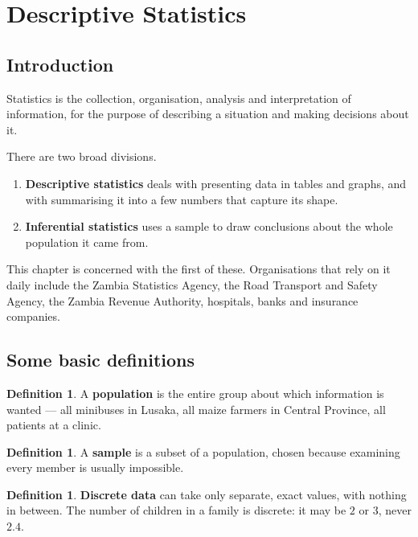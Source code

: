 \documentclass[11pt,a4paper]{article}
\theoremstyle{definition}
\newtheorem{definition}[thm]{Definition}
\begin{document}
\section{Descriptive Statistics}

\subsection{Introduction}

Statistics is the collection, organisation, analysis and interpretation of information,
for the purpose of describing a situation and making decisions about it.

There are two broad divisions.

\begin{enumerate}
\item[(a).] \textbf{Descriptive statistics} deals with presenting data in tables and
graphs, and with summarising it into a few numbers that capture its shape.
\item[(b).] \textbf{Inferential statistics} uses a sample to draw conclusions about the
whole population it came from.
\end{enumerate}

This chapter is concerned with the first of these. Organisations that rely on it daily
include the Zambia Statistics Agency, the Road Transport and Safety Agency, the Zambia
Revenue Authority, hospitals, banks and insurance companies.

\subsection{Some basic definitions}

\begin{definition}
A \textbf{population} is the entire group about which information is wanted --- all
minibuses in Lusaka, all maize farmers in Central Province, all patients at a clinic.
\end{definition}

\begin{definition}
A \textbf{sample} is a subset of a population, chosen because examining every member is
usually impossible.
\end{definition}

\begin{definition}
\textbf{Discrete data} can take only separate, exact values, with nothing in between.
The number of children in a family is discrete: it may be $2$ or $3$, never $2.4$.
\end{definition}
\end{document}
